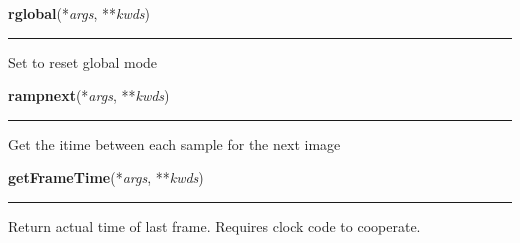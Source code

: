     \label{dsp:rglobal}

    \vspace{0.5ex}

    \begin{boxedminipage}{\textwidth}

    \raggedright \textbf{rglobal}(*\textit{args}, **\textit{kwds})

    \vspace{-1.5ex}

    \rule{\textwidth}{0.5\fboxrule}
    Set to reset global mode

    \vspace{1ex}

    \end{boxedminipage}

    \label{dsp:rampnext}

    \vspace{0.5ex}

    \begin{boxedminipage}{\textwidth}

    \raggedright \textbf{rampnext}(*\textit{args}, **\textit{kwds})

    \vspace{-1.5ex}

    \rule{\textwidth}{0.5\fboxrule}
    Get the itime between each sample for the next image

    \vspace{1ex}

    \end{boxedminipage}

    \label{dsp:getFrameTime}

    \vspace{0.5ex}

    \begin{boxedminipage}{\textwidth}

    \raggedright \textbf{getFrameTime}(*\textit{args}, **\textit{kwds})

    \vspace{-1.5ex}

    \rule{\textwidth}{0.5\fboxrule}
    Return actual time of last frame. Requires clock code to cooperate.

    \vspace{1ex}

    \end{boxedminipage}

